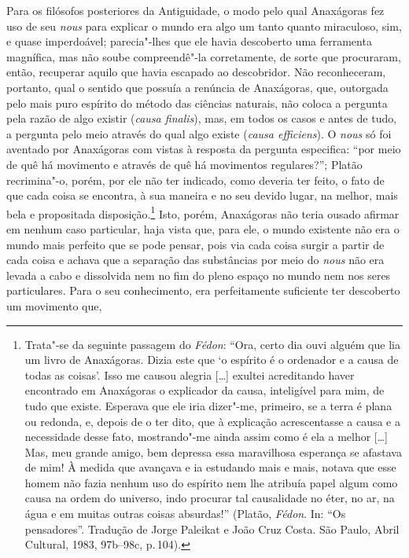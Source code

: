 Para os filósofos posteriores da Antiguidade, o modo pelo qual Anaxágoras fez
uso de seu \textit{nous} para explicar o mundo era algo um tanto quanto
miraculoso, sim, e quase imperdoável; parecia"-lhes que ele havia descoberto
uma ferramenta magnífica, mas não soube compreendê"-la corretamente, de sorte
que procuraram, então, recuperar aquilo que havia escapado ao descobridor.
Não reconheceram, portanto, qual o sentido que possuía a renúncia de
Anaxágoras, que, outorgada pelo mais puro espírito do método das ciências
naturais, não coloca a pergunta pela razão de algo existir (\textit{causa finalis}),
 mas, em \label{causafinalis} todos os casos e antes de tudo, a pergunta pelo 
 meio através do qual algo existe (\textit{causa efficiens}). 
O \textit{nous} só foi aventado por Anaxágoras com vistas
à resposta da pergunta especifica: ``por meio de quê há movimento e através
de quê há movimentos regulares?''; Platão recrimina"-o, porém, por ele não
ter indicado, como deveria ter feito, o fato de que cada coisa se encontra, à
sua maneira e no seu devido lugar, na melhor, mais bela e propositada
disposição.\footnote{Trata"-se da seguinte passagem do \textit{Fédon}: 
``Ora, certo dia ouvi alguém que lia um livro de Anaxágoras. Dizia
este que `o espírito é o ordenador e a causa de todas as coisas'. Isso me
causou alegria [\ldots] exultei acreditando haver encontrado em Anaxágoras o
explicador da causa, inteligível para mim, de tudo que existe. Esperava que
ele iria dizer"-me, primeiro, se a terra é plana ou redonda, e, depois de o
ter dito, que à explicação acrescentasse a causa e a necessidade desse fato,
mostrando"-me ainda assim como é ela a melhor [\ldots] Mas, meu grande amigo,
bem depressa essa maravilhosa esperança se afastava de mim! À medida que
avançava e ia estudando mais e mais, notava que esse homem não fazia nenhum
uso do espírito nem lhe atribuía papel algum como causa na ordem do universo,
indo procurar tal causalidade no éter, no ar, na água e em muitas outras
coisas absurdas!'' (Platão, \textit{Fédon}. In: ``Os pensadores''. Tradução de 
Jorge Paleikat e João Cruz Costa. São Paulo, Abril Cultural, 1983, 97b--98c, p.\,104).} 
Isto, porém, Anaxágoras não teria ousado afirmar em nenhum caso particular, haja vista
 que, para ele, o mundo existente não era o mundo mais perfeito que se pode
 pensar, pois via cada coisa surgir a partir de cada coisa e achava que a
 separação das substâncias por meio do \textit{nous} não era levada a cabo e 
 dissolvida nem no fim do pleno espaço no mundo nem nos seres particulares. 
 Para o seu conhecimento, era perfeitamente suficiente ter descoberto um movimento que, 

